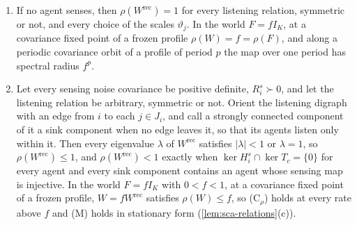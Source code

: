 \begin{proposition}
\begin{enumerate}
\item[(c)] If no agent senses, then $\rho(W^{\mathrm{rec}})=1$ for every listening relation, symmetric or not, and every choice of the scales $\vartheta_j$. In the world $F=fI_K$, at a covariance fixed point of a frozen profile $\rho(W)=f=\rho(F)$, and along a periodic covariance orbit of a profile of period $p$ the map over one period has spectral radius $f^p$.
\item[(d)] Let every sensing noise covariance be positive definite, $R^s_i\succ0$, and let the listening relation be arbitrary, symmetric or not. Orient the listening digraph with an edge from $i$ to each $j\in J_i$, and call a strongly connected component of it a sink component when no edge leaves it, so that its agents listen only within it. Then every eigenvalue $\lambda$ of $W^{\mathrm{rec}}$ satisfies $\lvert\lambda\rvert<1$ or $\lambda=1$, so $\rho(W^{\mathrm{rec}})\le1$, and $\rho(W^{\mathrm{rec}})<1$ exactly when $\ker H^s_i\cap\ker T_c=\{0\}$ for every agent and every sink component contains an agent whose sensing map is injective. In the world $F=fI_K$ with $0<f<1$, at a covariance fixed point of a frozen profile, $W=fW^{\mathrm{rec}}$ satisfies $\rho(W)\le f$, so \textup{(C$_\rho$)} holds at every rate above $f$ and \textup{(M)} holds in stationary form (\cref{lem:sca-relations}(c)).
\end{enumerate}
\end{proposition}
